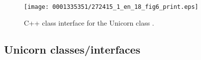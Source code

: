 \begin{figure}
\bwfig
\texttt{[image: 0001335351/272415\_1\_en\_18\_fig6\_print.eps]}
\caption{C++ class interface for the Unicorn class .}
\label{code:UCSolver}
\end{figure}

\subsection{Unicorn classes/interfaces}

